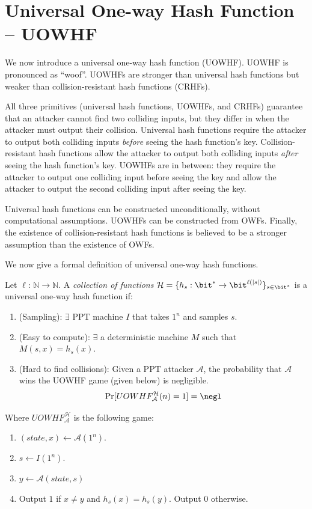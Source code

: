 \section{Universal One-way Hash Function -- UOWHF}
We now introduce a universal one-way hash function (UOWHF). UOWHF is pronounced as ``woof''.
UOWHFs are stronger than universal hash functions but weaker than collision-resistant hash functions (CRHFs). 

All three primitives (universal hash functions, UOWHFs, and CRHFs) guarantee that an attacker cannot find two colliding inputs, but they differ in when the attacker must output their collision. Universal hash functions require the attacker to output both colliding inputs \textit{before} seeing the hash function's key. Collision-resistant hash functions allow the attacker to output both colliding inputs \textit{after} seeing the hash function's key. UOWHFs are in between: they require the attacker to output one colliding input before seeing the key and allow the attacker to output the second colliding input after seeing the key.

Universal hash functions can be constructed unconditionally, without computational assumptions. UOWHFs can be constructed from OWFs. Finally, the existence of collision-resistant hash functions is believed to be a stronger assumption than the existence of OWFs.

We now give a formal definition of universal one-way hash functions. 
\begin{definition}
    Let $\ell$: $\mathbb{N}\rightarrow\mathbb{N}$. A \textit{collection of functions} 
    $\mathcal{H} = \{h_s: \bit^*\rightarrow\bit^{\ell(|s|)}\}_{s\in\bit^{*}}$ is a universal one-way hash function if:
    \begin{enumerate}
        \item (Sampling): $\exists$ PPT machine $I$ that takes $1^n$ and samples $s$.
        \item (Easy to compute): $\exists$ a deterministic machine $M$ such that $M(s,x)=h_s(x)$.
        \item (Hard to find collisions): Given a PPT attacker $\mathcal{A}$, the probability that $\mathcal{A}$ wins the UOWHF game (given below) is negligible. 
        \[
            \Pr[UOWHF^{\mathcal{H}}_{\mathcal{A}}(n)=1]=\negl
        \]
    \end{enumerate}
\end{definition}
Where $UOWHF^{\mathcal{H}}_{\mathcal{A}}$ is the following game:
\begin{enumerate}
    \item $(state, x)\leftarrow\mathcal{A}(1^n)$.
    \item $s\leftarrow I(1^n)$.
    \item $y\leftarrow\mathcal{A}(state, s)$
    \item Output $1$ if $x \neq y$ and $h_s(x)=h_s(y)$. Output $0$ otherwise.
\end{enumerate}


